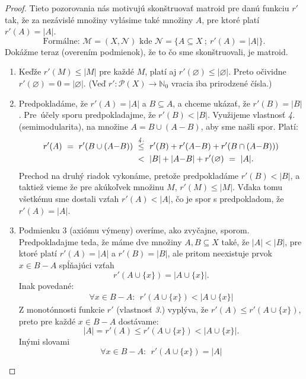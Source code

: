 \begin{proof}
	Tieto pozorovania nás motivujú skonštruovať matroid pre danú funkciu $r'$ tak, že za nezávislé množiny vylásime také množiny $A$, pre ktoré platí $r'(A) = |A|$.
	$$\text{Formálne: } \mathcal{M}=(X,\mathcal{N}) \text{ kde } \mathcal{N}=\{A\subseteq X ~;~ r'(A) = |A|\}.$$
	Dokážme teraz (overením podmienok), že to čo sme skonštruovali, je matroid.
	\begin{enumerate}
		\item
		Keďže $r'(M) \le |M|$ pre každé $M$, platí aj $r'(\varnothing) \le |\varnothing|$. Preto očividne $r'(\varnothing) = 0 = |\varnothing|$. (Veď $r' : \mathcal{P}(X) \rightarrow \mathbb{N}_0$ vracia iba prirodzené čísla.)

		\item
		Predpokladáme, že $r'(A) = |A|$ a $B \subseteq A$, a chceme ukázať, že $r'(B) = |B|$. Pre~účely sporu predpokladajme, že $r'(B) < |B|$. Využijeme vlastnosť {\it 4.} (semimodularita), na množine $A=B\cup (A{-}B)$, aby sme našli spor. Platí:
		\begin{align*}
			r'(A) ~=~ r'(B \cup (A{-}B))	~&\overset{\it 4.}{\le}~ r'(B)+r'(A{-}B)+r'(B \cap (A{-}B)))		\\
							~&<~ |B| + |A{-}B| + r'(\varnothing) ~=~ |A|.
		\end{align*}
		Prechod na druhý riadok vykonáme, pretože predpokladáme $r'(B) < |B|$, a taktiež vieme že pre akúkoľvek množinu $M$, $r'(M) \le |M|$. Vďaka tomu všetkému sme dostali vzťah $r'(A) < |A|$, čo je spor s predpokladom, že $r'(A) = |A|$.

		\item
		Podmienku 3 (axiómu výmeny) overíme, ako zvyčajne, sporom. Predpokladajme teda, že máme dve množiny $A,B \subseteq X$ také, že $|A| < |B|$, pre ktoré platí $r'(A)=|A|$ a $r'(B)=|B|$, ale pritom neexistuje prvok $x\in B{-}A$ spĺňajúci vzťah
		$$r'(A \cup \{x\}) = |A \cup \{x\}|.$$
		Inak povedané:
		\begin{align*}
			\forall x \in B{-}A:~~ r'(A \cup \{x\}) < |A \cup \{x\}|
		\end{align*}
		Z monotónnosti funkcie $r'$ (vlastnosť {\it 3.}) vyplýva, že $r'(A) \le r'(A \cup \{x\})$, preto pre každé $x\in B-A$ dostávame:
		$$|A|=r'(A) \le r'(A \cup \{x\}) < |A \cup \{x\}|.$$
		Inými slovami
		\begin{equation}
			\forall x \in B{-}A:~~ r'(A \cup \{x\}) = |A|
		\label{predpoklad}
		\end{equation}


\end{enumerate}
\end{proof}
